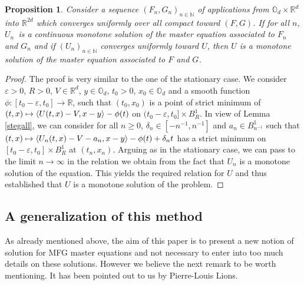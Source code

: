 \documentclass[JEP,XML,SOM,Unicode,NoEqCountersInSection,published]{cedram}
\newcommand\mto{\mathchoice{\longmapsto}{\mapsto}{\mapsto}{\mapsto}}
\let\epsilon\varepsilon
\newtheorem{Prop}{Proposition}[section]
\theoremstyle{definition}
\begin{document}
\begin{Prop}\label{propstab}
Consider a sequence $(F_n,G_n)_{n \in \mathbb{N}}$ of applications from $\mathbb{O}_d\times \mathbb{R}^d$ into $\mathbb{R}^{2d}$ which converges uniformly over all compact toward $(F,G)$. If for all $n$, $U_n$~is a continuous monotone solution of the master equation associated to $F_n$ and $G_n$ and if $(U_n)_{n \in \mathbb{N}}$ converges uniformly toward $U$, then $U$ is a monotone solution of the master equation associated to $F$ and $G$.
\end{Prop}
\begin{proof}
The proof is very similar to the one of the stationary case. We consider \hbox{$\epsilon\!>\!0$}, $R >0$, $V \in \mathbb{R}^d$, $y \in \mathbb{O}_d$, $t_0 > 0$, $x_0 \in \mathbb{O}_d$ and a smooth function \hbox{$\phi: [t_0-\epsilon, t_0] \to \mathbb{R}$}, such that $(t_0,x_0)$ is a point of strict minimum of $(t,x) \mto \langle U(t,x)-V, x-y\rangle-\phi(t)$ on $(t_0-\epsilon, t_0] \times B^1_R$. In view of Lemma \ref{stegall}, we can consider for all $n \geq 0$, $\delta_n \in [-n^{-1},n^{-1}]$ and $a_n \in B^1_{n^{-1}}$ such that $(t,x) \mto \langle U_n(t,x)-V-a_n, x-y\rangle-\phi(t)+\delta_n t$ has a strict minimum on $[t_0-\epsilon, t_0] \times B^1_R$
at $(t_n,x_n)$. Arguing as in the stationary case, we can pass to the limit $n \to \infty$ in the relation we obtain from the fact that $U_n$ is a monotone solution of the equation. This yields the required relation for $U$ and thus established that $U$ is a monotone solution of the problem.
\end{proof}

\subsection{A generalization of this method}
As already mentioned above, the aim of this paper is to present a new notion of solution for MFG master equations and not necessary to enter into too much details on these solutions. However we believe the next remark to be worth mentioning. It has been pointed out to us by Pierre-Louis Lions.
\end{document}
